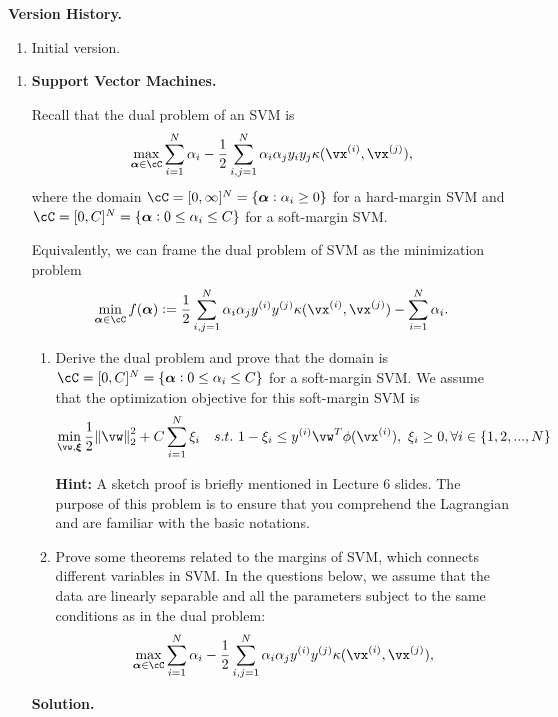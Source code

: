 \documentclass{article}
\def\balpha{\boldsymbol{\alpha}}
\theoremstyle{definition}
\theoremstyle{remark}
\newenvironment{Q}
{%
\clearpage
\item
}
{%
\phantom{s} %
\bigskip
\textbf{Solution.}
}
\begin{document}
\noindent\textbf{Version History.}
\begin{enumerate}
    \item Initial version.
\end{enumerate}

\begin{enumerate}[font={\Large\bfseries},left=0pt]
  
\begin{Q}
    \textbf{\Large Support Vector Machines.}
    
    Recall that the dual problem of an SVM is
    \begin{align*}
        \max_{\balpha\in\cC}\sum_{i=1}^{N}\alpha_i-\frac{1}{2}\sum_{i,j=1}^{N}\alpha_i\alpha_jy_iy_j\kappa(\vx^{(i)},\vx^{(j)}),
    \end{align*}
    where the domain $\cC=[0, \infty]^N=\{\balpha:\alpha_i\ge0\}$ for a hard-margin SVM and $\cC=[0,C]^N=\{\balpha:0\le\alpha_i\le C\}$ for a soft-margin SVM.
    
    
    Equivalently, we can frame the dual problem of SVM as the minimization problem
    \begin{align*}
        \min_{\balpha\in\cC}f(\balpha):=\frac{1}{2}\sum_{i,j=1}^{N}\alpha_i\alpha_jy^{(i)}y^{(j)}\kappa(\vx^{(i)},\vx^{(j)})-\sum_{i=1}^{N}\alpha_i.
    \end{align*}

    \begin{enumerate}
        \item Derive the dual problem and prove that the domain is $\cC=[0,C]^N=\{\balpha:0\le\alpha_i\le C\}$ for a soft-margin SVM. We assume that the optimization objective for this soft-margin SVM is
        \begin{align*}
            \min_{\vw, \boldsymbol{\xi}}\frac{1}{2}\enVert{\vw}^2_2+C\sum_{i=1}^{N}\xi_i \quad s.t.\ 1-\xi_i \leq y^{(i)}\vw^{T}\phi(\vx^{(i)}),\ \xi_i \geq 0, \forall i\in\left\{1, 2, ..., N\right\}
        \end{align*}
        
        \textbf{Hint:} A sketch proof is briefly mentioned in Lecture 6 slides. The purpose of this problem is to ensure that you comprehend the Lagrangian and are familiar with the basic notations.
        
        \item Prove some theorems related to the margins of SVM, which connects different variables in SVM. In the questions below, we assume that the data are linearly separable and all the parameters subject to the same conditions as in the dual problem:
        \begin{align*}
            \max_{\balpha\in\cC}\sum_{i=1}^{N}\alpha_i-\frac{1}{2}\sum_{i,j=1}^{N}\alpha_i\alpha_jy^{(i)}y^{(j)}\kappa(\vx^{(i)},\vx^{(j)}),
        \end{align*}
        

\end{enumerate}
\end{Q}
\end{enumerate}
\end{document}
